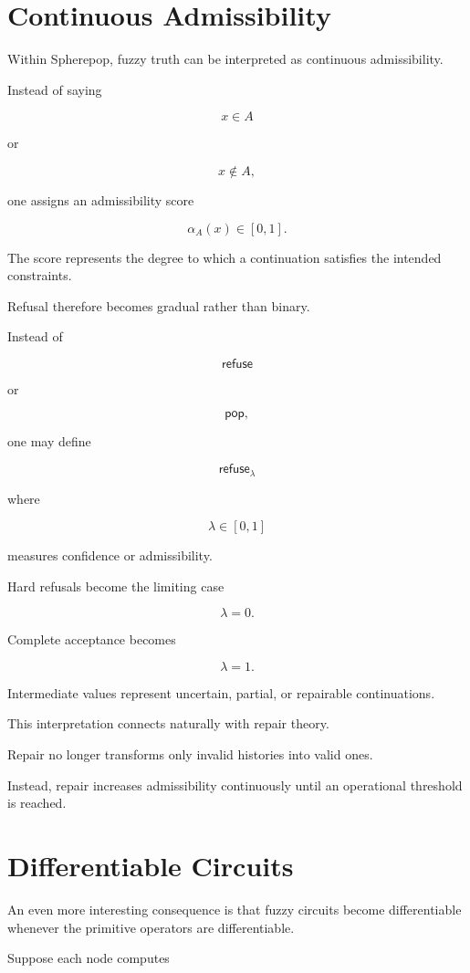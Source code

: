 \documentclass[12pt,oneside]{article}
\newcommand{\Pop}{\mathsf{pop}}
\newcommand{\Refuse}{\mathsf{refuse}}
\begin{document}
\section{Continuous Admissibility}

Within Spherepop, fuzzy truth can be interpreted as continuous admissibility.

Instead of saying

\[
x\in A
\]

or

\[
x\notin A,
\]

one assigns an admissibility score

\[
\alpha_A(x)\in[0,1].
\]

The score represents the degree to which a continuation satisfies the intended constraints.

Refusal therefore becomes gradual rather than binary.

Instead of

\[
\Refuse
\]

or

\[
\Pop,
\]

one may define

\[
\Refuse_\lambda
\]

where

\[
\lambda\in[0,1]
\]

measures confidence or admissibility.

Hard refusals become the limiting case

\[
\lambda=0.
\]

Complete acceptance becomes

\[
\lambda=1.
\]

Intermediate values represent uncertain, partial, or repairable continuations.

This interpretation connects naturally with repair theory.

Repair no longer transforms only invalid histories into valid ones.

Instead, repair increases admissibility continuously until an operational threshold is reached.

\section{Differentiable Circuits}

An even more interesting consequence is that fuzzy circuits become differentiable whenever the primitive operators are differentiable.

Suppose each node computes
\end{document}
